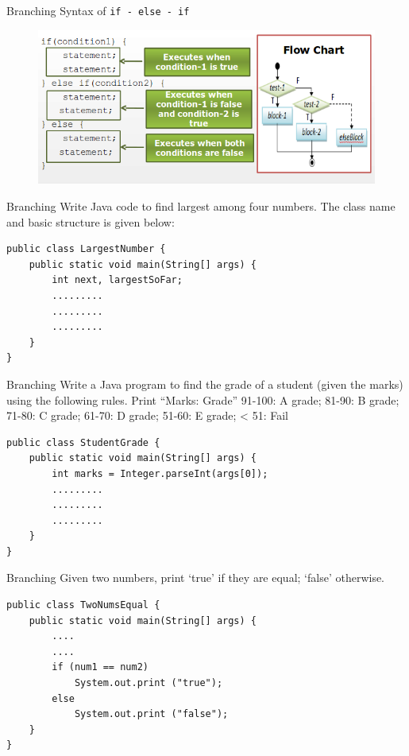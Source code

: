 \documentclass[12pt]{beamer}
\begin{document}
\begin{frame}{Branching}
 Syntax of \lstinline!if - else - if!
  \begin{figure}[H]
   \begin{center}
    \includegraphics[scale=.5]{syntax-if-else-if.png}
   \end{center}

  \end{figure}

\end{frame}

\begin{frame}[fragile]{Branching}
 Write Java code to find largest among four numbers. The class name and basic structure  is given below:
 \begin{lstlisting}[numbers=none]
public class LargestNumber {
    public static void main(String[] args) {
        int next, largestSoFar;
        .........
        .........
        .........
    }
}  
 \end{lstlisting}

\end{frame}

\begin{frame}[fragile]{Branching}
Write a Java program to find the grade of a student (given the marks) using the following rules. Print ``Marks: Grade''
91-100: A grade; 81-90: B grade; 71-80: C grade; 
61-70: D grade; 51-60: E grade;  < 51: Fail

\begin{lstlisting}[numbers=none]
public class StudentGrade {
    public static void main(String[] args) {
        int marks = Integer.parseInt(args[0]);
        .........
        .........
        .........
    }
}
\end{lstlisting}
\end{frame}

\begin{frame}[fragile]{Branching}
 Given two numbers, print `true' if they are equal; `false' otherwise.
 \begin{lstlisting}[numbers=none]
public class TwoNumsEqual {
    public static void main(String[] args) {
        ....
        ....
        if (num1 == num2)
            System.out.print ("true");
        else
            System.out.print ("false");
    }
}
 \end{lstlisting}
\end{frame}
\end{document}
